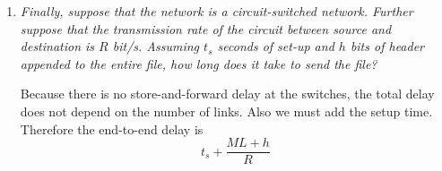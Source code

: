 \documentclass[11pt,a4paper]{article}
\begin{document}
\begin{enumerate}
\begin{enumerate}
      \item \emph{Finally, suppose that the network is a
        circuit-switched network. Further suppose that the
        transmission rate of the circuit between source and
        destination is \(R\) bit/s. Assuming \(t_s\) seconds of set-up
        and \(h\) bits of header appended to the entire file, how long
        does it take to send the file?}

        Because there is no store-and-forward delay at the switches,
        the total delay does not depend on the number of links. Also
        we must add the setup time. Therefore the end-to-end delay is
        \[
          t_{s} + \frac{M L + h}{R}
        \]

    \end{enumerate}

\end{enumerate}
\end{document}
